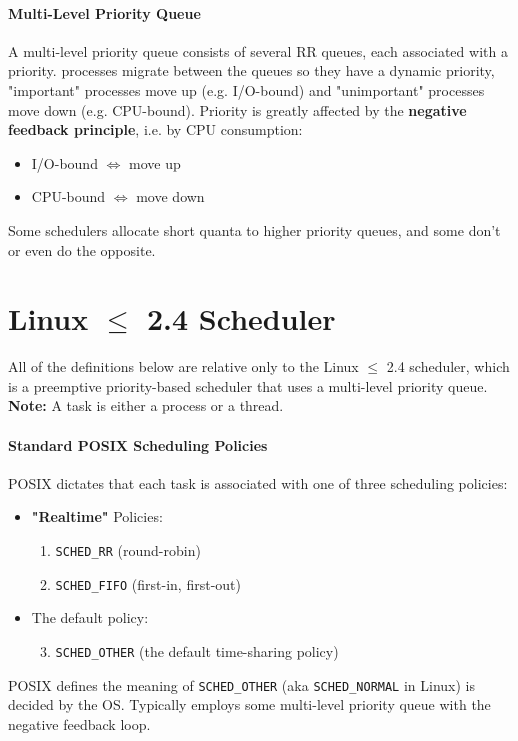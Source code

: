 \documentclass[openany,12pt]{book}
\newcommand{\code}[1]{\texttt{#1}}
\begin{document}
\paragraph{Multi-Level Priority Queue} A multi-level priority queue consists of several RR queues, each associated with a priority. processes migrate between the queues so they have a dynamic priority, "important" processes move up (e.g. I/O-bound) and "unimportant" processes move down (e.g. CPU-bound). Priority is greatly affected by the \textbf{negative feedback principle}, i.e. by CPU consumption:
\begin{itemize}
    \item I/O-bound \(\Longleftrightarrow\) move up
    \item CPU-bound \(\Longleftrightarrow\) move down
\end{itemize}
Some schedulers allocate short quanta to higher priority queues, and some don't or even do the opposite.



\section*{Linux \(\leq\) 2.4 Scheduler}
All of the definitions below are relative only to the Linux \(\leq\) 2.4 scheduler, which is a preemptive priority-based scheduler that uses a multi-level priority queue. \textbf{Note:} A task is either a process or a thread.

\paragraph{Standard POSIX Scheduling Policies} POSIX dictates that each task is associated with one of three scheduling policies:
\begin{itemize}
    \item \textbf{"Realtime"} Policies:
          \begin{enumerate}
              \item \code{SCHED\_RR} (round-robin)
              \item \code{SCHED\_FIFO} (first-in, first-out)
          \end{enumerate}
    \item The default policy:
          \begin{enumerate}
              \setcounter{enumi}{2}
              \item \code{SCHED\_OTHER} (the default time-sharing policy)
          \end{enumerate}
\end{itemize}
POSIX defines the meaning of \code{SCHED\_OTHER} (aka \code{SCHED\_NORMAL} in Linux) is decided by the OS. Typically employs some multi-level priority queue with the negative feedback loop.
\end{document}
